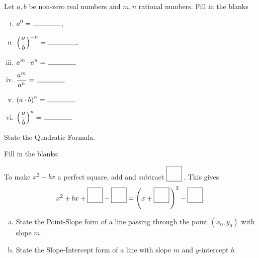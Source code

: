\documentclass[12pt]{amsart}
\begin{document}
\begin{thm}[6 Points]\label{ex2}
  Let $a, b$ be non-zero real numbers and $m, n$ rational numbers.
  Fill in the blanks
  \begin{enumerate}[(i)]
  \item
    $\displaystyle{a^0 =\ \line(1,0){40}}$,
  \item
    $\displaystyle{\left(\frac{a}{b}\right)^{-n} =\ \line(1,0){40}}.$
  \item
    $\displaystyle{a^m \cdot a^n =\ \line(1,0){40}}$
  \item
    $\displaystyle{\frac{a^m}{a^n} =\ \line(1,0){40}}$
  \item
    $\displaystyle{\left(a \cdot b\right)^n =\ \line(1,0){40}}$
  \item
    $\displaystyle{\left(\frac{a}{b}\right)^n =\ \line(1,0){40}}$
  \end{enumerate}
\end{thm}

\begin{thm}[1 Points]\label{ex3}
  State the Quadratic Formula.
  \vspace{1in}
\end{thm}

\begin{thm}[1 Points]\label{ex4}
  Fill in the blanks:\\
  \begin{center}
    To make $x^2 + bx$ a perfect square, add and subtract $\fbox{\raisebox{15px}{\hspace{15px}}}$\,.
    This gives
    $$x^2 + bx + \fbox{\raisebox{15px}{\hspace{15px}}} - \fbox{\raisebox{15px}{\hspace{15px}}} = \left(x + \fbox{\raisebox{15px}{\hspace{15px}}}\,\right)^2 - \fbox{\raisebox{15px}{\hspace{15px}}}.$$
  \end{center}
\end{thm}

\begin{thm}[2 Points]\label{ex1}
  \begin{enumerate}[(a)]
  \item
    State the Point-Slope form of a line passing through the point $(x_0, y_0)$ with slope $m$.
    \vspace{1in}
  \item
    State the Slope-Intercept form of a line with slope $m$ and $y$-intercept $b$.
    \vspace{1in}
  \end{enumerate}
\end{thm}
\newpage
\end{document}

